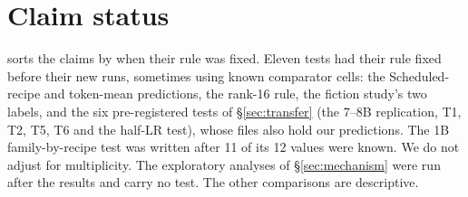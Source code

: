 \documentclass{article}
\begin{document}
\FloatBarrier
\section{Claim status}
\label{app:claims}

 sorts the claims by when their rule was fixed. Eleven tests
had their rule fixed before their new runs, sometimes using known comparator
cells: the Scheduled-recipe and token-mean
predictions, the rank-16 rule, the fiction study's two labels, and the six
pre-registered tests of \S\ref{sec:transfer} (the 7--8B replication, T1, T2,
T5, T6 and the half-LR test), whose files also hold our predictions. The 1B
family-by-recipe test was written after 11 of its 12 values were known. We do
not adjust for multiplicity. The exploratory analyses of \S\ref{sec:mechanism}
were run after the results and carry no test. The other comparisons are
descriptive.
\end{document}
